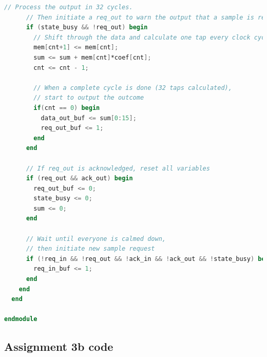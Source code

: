 \documentclass[a4paper,twoside,11pt, fleqn]{article}
\begin{document}
\begin{lstlisting}[language=Verilog]
      // Process the output in 32 cycles. 
      // Then initiate a req_out to warn the output that a sample is ready
      if (state_busy && !req_out) begin
        // Shift through the data and calculate one tap every clock cycle
        mem[cnt+1] <= mem[cnt];
        sum <= sum + mem[cnt]*coef[cnt];
        cnt <= cnt - 1;

        // When a complete cycle is done (32 taps calculated),
        // start to output the outcome
        if(cnt == 0) begin
          data_out_buf <= sum[0:15];
          req_out_buf <= 1;
        end
      end

      // If req_out is acknowledged, reset all variables
      if (req_out && ack_out) begin
        req_out_buf <= 0;
        state_busy <= 0;
        sum <= 0;
      end

      // Wait until everyone is calmed down,
      // then initiate new sample request
      if (!req_in && !req_out && !ack_in && !ack_out && !state_busy) begin   
        req_in_buf <= 1;
      end	
    end
  end

endmodule
\end{lstlisting}

\newpage
\subsection{Assignment 3b code}
\label{code:3b}
\end{document}

